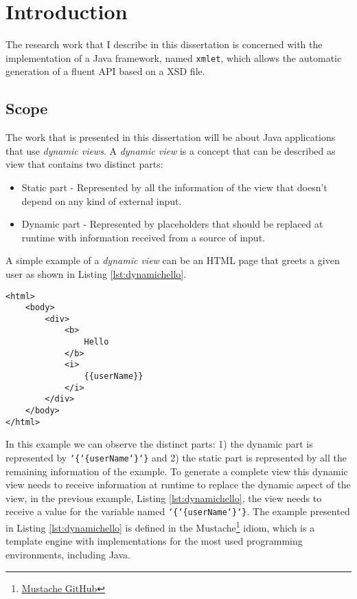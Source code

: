 \chapter{Introduction}
\label{cha:introduction}

The research work that I describe in this dissertation is concerned with the implementation of a Java framework, named \texttt{xmlet}, which allows the automatic generation of a fluent \ac{API} based on a \ac{XSD} file. 

\section{Scope}

The work that is presented in this dissertation will be about Java applications that use \textit{dynamic views}. A \textit{dynamic view} is a concept that can be described as view that contains two distinct parts:

\begin{itemize}
	\item Static part - Represented by all the information of the view that doesn't depend on any kind of external input.
	\item Dynamic part - Represented by placeholders that should be replaced at runtime with information received from a source of input.
\end{itemize} 

\noindent
A simple example of a \textit{dynamic view} can be an \ac{HTML} page that greets a given user as shown in Listing \ref{lst:dynamichello}. 

\lstset{language=html}

\begin{minipage}{\linewidth}
\begin{lstlisting}[caption={Dynamic Hello}, label={lst:dynamichello}]
<html>
	<body>
		<div>
			<b>
				Hello
			</b> 
			<i>
				{{userName}}
			</i>
		</div>
	</body>
</html>
\end{lstlisting}
\end{minipage} 

\noindent
In this example we can observe the distinct parts: 1) the dynamic part is represented by \texttt{\char`\{\char`\{userName\char`\}\char`\}} and 2) the static part is represented by all the remaining information of the example. To generate a complete view this dynamic view needs to receive information at runtime to replace the dynamic aspect of the view, in the previous example, Listing \ref{lst:dynamichello}, the view needs to receive a value for the variable named \texttt{\char`\{\char`\{userName\char`\}\char`\}}. The example presented in Listing \ref{lst:dynamichello} is defined in the Mustache\footnote{\href{https://mustache.github.io/}{Mustache GitHub}} idiom, which is a template engine with implementations for the most used programming environments, including Java.

